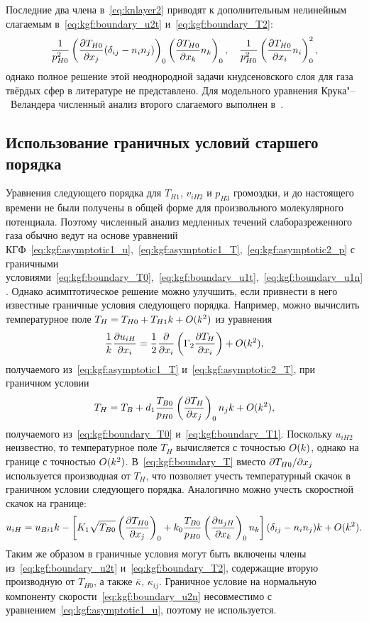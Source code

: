 Последние два члена в~\eqref{eq:knlayer2} приводят к дополнительным нелинейным слагаемым
в~\eqref{eq:kgf:boundary_u2t} и~\eqref{eq:kgf:boundary_T2}:
\begin{equation}\label{eq:boundary_nonlinear}
    \frac1{p_{H0}^2}\onwall{\pder[T_{H0}]{x_j}\deltann{i}{j}}\onwall{\pder[T_{H0}]{x_k}n_k}, \quad
    \frac1{p_{H0}^2}\onwall{\pder[T_{H0}]{x_i}n_i}^2,
\end{equation}
однако полное решение этой неоднородной задачи кнудсеновского слоя для газа твёрдых сфер в литературе не представлено.
Для модельного уравнения Крука"--~Веландера численный анализ второго слагаемого выполнен в~\cite{Sone1970}.

\subsection{Использование граничных условий старшего порядка}

Уравнения следующего порядка для \(T_{H1}\), \(v_{iH2}\) и \(p_{H3}\) громоздки,
и до настоящего времени не были получены в общей форме для произвольного молекулярного потенциала.
Поэтому численный анализ медленных течений слаборазреженного газа обычно ведут
на основе уравнений КГФ~\eqref{eq:kgf:asymptotic1_u},~\eqref{eq:kgf:asymptotic1_T},~\eqref{eq:kgf:asymptotic2_p}
с граничными условиями~\eqref{eq:kgf:boundary_T0},~\eqref{eq:kgf:boundary_u1t},~\eqref{eq:kgf:boundary_u1n}.
Однако асимптотическое решение можно улучшить,
если привнести в него известные граничные условия следующего порядка.
Например, можно вычислить температурное поле \(T_H = T_{H0} + T_{H1}k + \OO{k^2}\) из уравнения
\begin{equation}\label{eq:asymptotic_T}
    \frac1k\pder[u_{iH}]{x_i} = \frac12\pder{x_i}\left(\Gamma_2\pder[T_H]{x_i}\right) + \OO{k^2},
\end{equation}
получаемого из~\eqref{eq:kgf:asymptotic1_T} и~\eqref{eq:kgf:asymptotic2_T},
при граничном условии
\begin{equation}\label{eq:kgf:boundary_T}
    T_H = T_B + d_1\frac{T_{B0}}{p_{H0}}\onwall{\pder[T_H]{x_j}}n_j k + \OO{k^2},
\end{equation}
получаемого из~\eqref{eq:kgf:boundary_T0} и~\eqref{eq:kgf:boundary_T1}.
Поскольку \(u_{iH2}\) неизвестно, то температурное поле \(T_H\) вычисляется с точностью \(\OO{k}\),
однако на границе с точностью \(\OO{k^2}\).
В~\eqref{eq:kgf:boundary_T} вместо \(\Pder[T_{H0}]{x_j}\) используется производная от \(T_H\),
что позволяет учесть температурный скачок в граничном условии следующего порядка.
Аналогично можно учесть скоростной скачок на границе:
\begin{equation}\label{eq:boundary_u}
    u_{iH} = u_{Bi1}k - \left[ K_1\sqrt{T_{B0}}\onwall{\pder[T_{H0}]{x_j}}
        + k_0\frac{T_{B0}}{p_{H0}}\onwall{\pder[u_{jH}]{x_k}}n_k \right] \deltann{i}{j}k + \OO{k^2}.
\end{equation}
Таким же образом в граничные условия могут быть включены члены
из~\eqref{eq:kgf:boundary_u2t} и~\eqref{eq:kgf:boundary_T2},
содержащие вторую производную от \(T_{H0}\), а также \(\bar\kappa\), \(\kappa_{ij}\).
Граничное условие на нормальную компоненту скорости~\eqref{eq:kgf:boundary_u2n}
несовместимо с уравнением~\eqref{eq:kgf:asymptotic1_u}, поэтому не используется.

